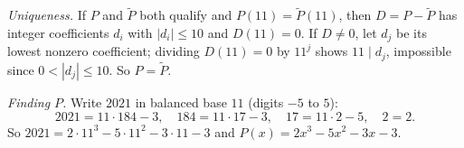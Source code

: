 \emph{Uniqueness.} If $P$ and $\tilde P$ both qualify and $P(11)=\tilde P(11)$, then $D=P-\tilde P$ has integer coefficients $d_i$ with $|d_i|\le10$ and $D(11)=0$. If $D\ne0$, let $d_j$ be its lowest nonzero coefficient; dividing $D(11)=0$ by $11^j$ shows $11\mid d_j$, impossible since $0<|d_j|\le10$. So $P=\tilde P$.

\emph{Finding $P$.} Write $2021$ in balanced base $11$ (digits $-5$ to $5$):
\[2021=11\cdot184-3,\quad184=11\cdot17-3,\quad17=11\cdot2-5,\quad2=2.\]
So $2021=2\cdot11^3-5\cdot11^2-3\cdot11-3$ and $P(x)=\boxed{2x^3-5x^2-3x-3}$.
